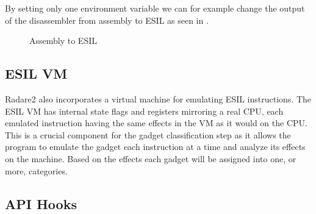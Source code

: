 By setting only one environment variable we can for example change the output of the disassembler from assembly to ESIL as seen in .

\begin{figure}[htp]%
	\centering
	\hfill
	\caption{Assembly to ESIL}
	\label{fig:disasEsil}
\end{figure}

\subsection{ESIL VM}

Radare2 also incorporates a virtual machine for emulating ESIL instructions. The ESIL VM has internal state flags and registers mirroring a real CPU, each emulated instruction having the same effects in the VM as it would on the CPU. This is a crucial component for the gadget classification step as it allows the program to emulate the gadget each instruction at a time and analyze its effects on the machine. Based on the effects each gadget will be assigned into one, or more, categories.


\subsection{API Hooks}

